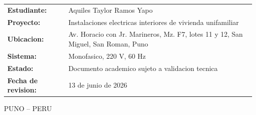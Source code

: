 \begin{titlepage}
\begin{minipage}{5.20in}
\vspace{0.40in}
\begin{flushleft}
\fontsize{10}{13}\selectfont
\renewcommand{\arraystretch}{1.23}
\begin{tabular}{>{\bfseries}p{1.75in}p{3.15in}}
Estudiante: & Aquiles Taylor Ramos Yapo \\
Proyecto: & Instalaciones electricas interiores de vivienda unifamiliar \\
Ubicacion: & Av. Horacio con Jr. Marineros, Mz. F7, lotes 11 y 12, San Miguel, San Roman, Puno \\
Sistema: & Monofasico, 220 V, 60 Hz \\
Estado: & Documento academico sujeto a validacion tecnica \\
Fecha de revision: & 13 de junio de 2026 \\
\end{tabular}
\end{flushleft}

\vfill
{\fontsize{10}{12}\selectfont PUNO -- PERU\par}
{\fontsize{9}{11}\par}
\end{minipage}

\end{titlepage}
